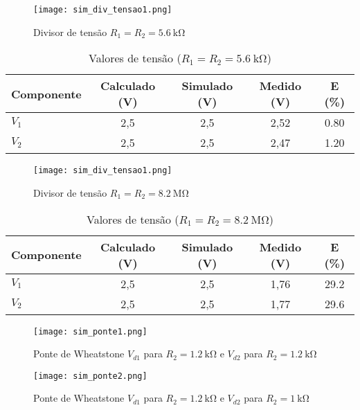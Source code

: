 \documentclass[a4paper, 12pt]{article}
\begin{document}
\begin{figure}[H]
\centering
\texttt{[image: sim\_div\_tensao1.png]}
\caption{Divisor de tensão $R_1 = R_2 = \SI{5,6}{\kilo\ohm}$}
\label{fig:sim_div_tensao1}
\end{figure}

\begin{table}[H]
\centering
\caption{Valores de tensão ($R_1 = R_2 = \SI{5,6}{\kilo\ohm}$)}
\label{tab:tensoes_div2}
\begin{tabular}{|l|c|c|c|c|}
\hline
\textbf{Componente} & \textbf{Calculado (\si{\volt})} & \textbf{Simulado (\si{\volt})} & \textbf{Medido (\si{\volt})} & \textbf{E (\%)} \\
\hline
$V_1$ & 2,5 & 2,5 & 2,52 & 0.80\\ \hline
$V_2$ & 2,5 & 2,5 & 2,47 & 1.20 \\ \hline
\end{tabular}
\end{table}

\begin{figure}[H]
\centering
\texttt{[image: sim\_div\_tensao1.png]}
\caption{Divisor de tensão $R_1 = R_2 = \SI{8,2}{\mega\ohm}$}
\label{fig:sim_div_tensao1}
\end{figure}

\begin{table}[H]
\centering
\caption{Valores de tensão ($R_1 = R_2 = \SI{8,2}{\mega\ohm}$)}
\label{tab:tensoes_div3}
\begin{tabular}{|l|c|c|c|c|}
\hline
\textbf{Componente} & \textbf{Calculado (\si{\volt})} & \textbf{Simulado (\si{\volt})} & \textbf{Medido (\si{\volt})} & \textbf{E (\%)} \\
\hline
$V_1$ & 2,5 & 2,5 & 1,76 & 29.2\\ \hline
$V_2$ & 2,5 & 2,5 & 1,77 & 29.6 \\ \hline
\end{tabular}
\end{table}

\begin{figure}[H]
\centering
\texttt{[image: sim\_ponte1.png]}
\caption{Ponte de Wheatstone $V_{d1}$ para $R_2=\SI{1,2}{\kilo\ohm}$ e $V_{d2}$ para $R_2=\SI{1,2}{\kilo\ohm}$}
\label{fig:sim_ponte1}
\end{figure}

\begin{figure}[H]
\centering
\texttt{[image: sim\_ponte2.png]}
\caption{Ponte de Wheatstone $V_{d1}$ para $R_2=\SI{1,2}{\kilo\ohm}$ e $V_{d2}$ para $R_2=\SI{1}{\kilo\ohm}$}
\label{fig:sim_ponte2}
\end{figure}
\end{document}
